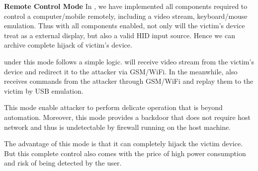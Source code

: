 \textbf{Remote Control Mode}
In \tool, we have implemented all components required to control a computer/mobile remotely, including a video stream, keyboard/mouse emulation. Thus with all components enabled, not only will the victim's device treat \tool as a external display, but also a valid HID input source. Hence we can archive complete hijack of victim's device.

\tool under this mode follows a simple logic. \tool will receive video stream from the victim's device and redirect it to the attacker via GSM/WiFi. In the meanwhile, \tool also receives commands from the attacker through GSM/WiFi and replay them to the victim by USB emulation.

This mode enable attacker to perform delicate operation that is beyond automation. Moreover, this mode provides a backdoor that does not require host network and thus is undetectable by firewall running on the host machine.

The advantage of this mode is that it can completely hijack the victim device. But this complete control also comes with the price of high power consumption and risk of being detected by the user.

